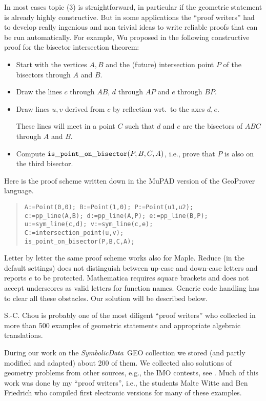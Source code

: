 \documentclass[11pt]{article}
\newcommand{\SD}{{\it Symbo\-lic\-Data}}
\newcommand{\gf}[1]{{\tt #1}\/}
\begin{document}
In most cases topic (3) is straightforward, in particular if the
geometric statement is already highly constructive.  But in some
applications the ``proof writers'' had to develop really
ingenious and non trivial ideas to write reliable proofs that can
be run automatically.  For example, Wu proposed in
\cite{Books/Wu_94a} the following constructive proof for the
bisector intersection theorem:
\begin{itemize}\itemsep0pt
\item Start with the vertices $A,B$ and the (future) intersection
point $P$ of the bisectors through $A$ and $B$.
\item Draw the lines $c$ through $AB$, $d$ through $AP$ and $e$
through $BP$.
\item Draw lines $u,v$ derived from $c$ by reflection wrt.\ to
the axes $d, e$.

These lines will meet in a point $C$ such that $d$ and $e$ are
the bisectors of $ABC$ through $A$ and $B$. 
\item Compute $\gf{is\_point\_on\_bisector}(P,B,C,A)$, i.e.,
prove that $P$ is also on the third bisector.
\end{itemize}
Here is the proof scheme written down in the MuPAD version of the
GeoProver language.
\begin{quote}
\begin{verbatim}
A:=Point(0,0); B:=Point(1,0); P:=Point(u1,u2);
c:=pp_line(A,B); d:=pp_line(A,P); e:=pp_line(B,P);
u:=sym_line(c,d); v:=sym_line(c,e);
C:=intersection_point(u,v);
is_point_on_bisector(P,B,C,A);
\end{verbatim}
\end{quote}
Letter by letter the same proof scheme works also for Maple. Reduce
(in the default settings) does not distinguish between up-case and
down-case letters and reports $e$ to be protected. Mathematica requires
square brackets and does not accept underscores as valid letters for
function names.  Generic code handling has to clear all these
obstacles.  Our solution will be described below.
\medskip

S.-C. Chou is probably one of the most diligent ``proof writers'' who
collected in \cite{Books/Chou_88a} more than 500 examples of geometric
statements and appropriate algebraic translations.

During our work on the \SD\ GEO collection we stored (and partly
modified and adapted) about 200 of them. We collected also solutions
of geometry problems from other sources, e.g., the IMO contests, see
\cite{IMO}. Much of this work was done by my ``proof writers'', i.e.,
the students Malte Witte and Ben Friedrich who compiled first
electronic versions for many of these examples.
\end{document}

